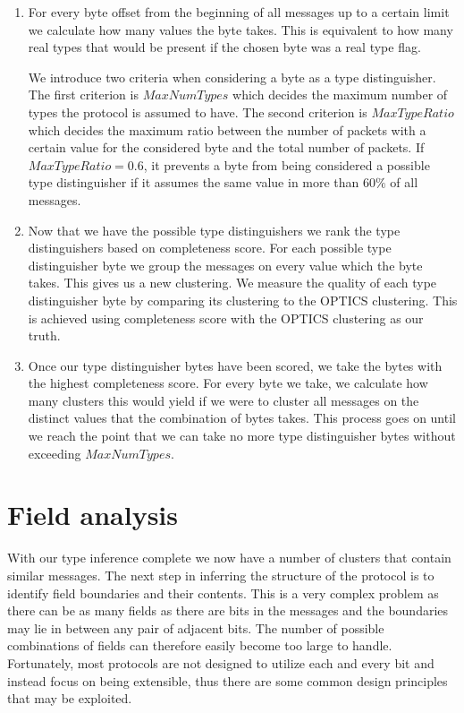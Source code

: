 \documentclass[a4paper]{report}
\begin{document}
\begin{enumerate}
    \item For every byte offset from the beginning of all messages up to a certain limit
    we calculate how many values the byte takes. This is equivalent to how many
    real types that would be present if the chosen byte was a real type flag.
    
    We introduce two criteria when considering a byte as a type distinguisher.
    The first criterion is $MaxNumTypes$ which decides the maximum number of
    types the protocol is assumed to have. The second criterion is
    $MaxTypeRatio$ which decides the maximum ratio between the number of packets
    with a certain value for the considered byte and the total number of
    packets. If $MaxTypeRatio = 0.6$, it prevents a byte from being considered
    a possible type distinguisher if it assumes the same value in more than
    $60\%$ of all messages.

    \item Now that we have the possible type distinguishers we rank the type
    distinguishers based on completeness score. For each possible type
    distinguisher byte we group the messages on every value which the byte
    takes. This gives us a new clustering. We measure the quality of each type
    distinguisher byte by comparing its clustering to the OPTICS clustering.
    This is achieved using completeness score with the OPTICS clustering as our
    truth. 

    \item Once our type distinguisher bytes have been scored, we take the bytes
    with the highest completeness score. For every byte we take, we calculate
    how many clusters this would yield if we were to cluster all messages on
    the distinct values that the combination of bytes takes. This process goes
    on until we reach the point that we can take no more type distinguisher
    bytes without exceeding $MaxNumTypes$.
\end{enumerate}

\section{Field analysis}
With our type inference complete we now have a number of clusters that contain
similar messages. The next step in inferring the structure of the protocol is
to identify field boundaries and their contents. This is a very complex
problem as there can be as many fields as there are bits in the messages and
the boundaries may lie in between any pair of adjacent bits. The number of
possible combinations of fields can therefore easily become too large to
handle. Fortunately, most protocols are not designed to utilize each and every
bit and instead focus on being extensible, thus there are some common design
principles that may be exploited.
\end{document}
